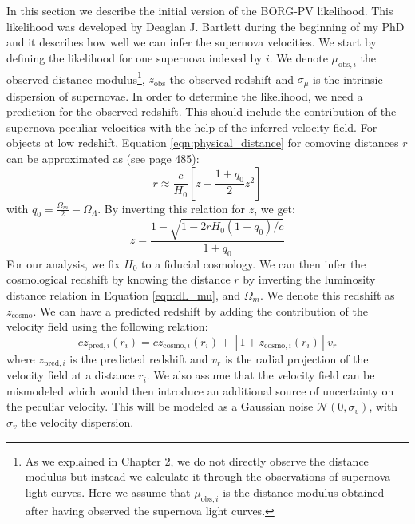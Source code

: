 In this section we describe the initial version of the BORG-PV likelihood. This likelihood was developed by Deaglan J. Bartlett during the beginning of my PhD
and it describes how well we can infer the supernova velocities. We start by defining the likelihood for one supernova indexed by $i$. 
We denote $\mu_{\text{obs},i}$ the observed distance modulus\footnote{As we explained in Chapter 2, we do not directly observe the distance modulus but instead we calculate it through
the observations of supernova light curves. Here we assume that $\mu_{\text{obs},i}$ is the distance modulus obtained after having observed the supernova light curves.}, 
$z_{\text{obs}}$ the observed redshift and $\sigma_{\mu}$ is the intrinsic dispersion of supernovae. 
In order to determine the likelihood, we need a prediction 
for the observed redshift. This should include the contribution of the supernova peculiar velocities with the help of the inferred velocity field. For objects at low redshift, 
Equation \ref{eqn:physical_distance} for comoving distances $r$ can be approximated as (see \cite{Weinberg_1972} page 485):
\begin{equation}
    r \approx \frac{c}{H_0} \left[ z - \frac{1+q_0}{2} z^2 \right]
\end{equation}
with $q_0 = \frac{\Omega_m}{2} - \Omega_{\Lambda} $. By inverting this relation for $z$, we get:
\begin{equation}
    z = \frac{1 - \sqrt{1 - 2rH_0(1+q_0)/c}}{1+q_0}
    \label{eqn:zcosmo}
\end{equation} 
For our analysis, we fix $H_0$ to a fiducial cosmology. We can then infer the cosmological redshift by knowing the distance $r$ 
by inverting the luminosity distance relation in Equation \ref{eqn:dL_mu}, and $\Omega_m$. We 
denote this redshift as $z_{\text{cosmo}}$. We can have a predicted redshift by adding the contribution of the velocity field using the following relation:
\begin{equation}
    cz_{\text{pred},i}(r_i) = cz_{\text{cosmo},i}(r_i) + [1+z_{\text{cosmo},i}(r_i)]v_r
\end{equation}
where $z_{\text{pred}, i}$ is the predicted redshift and $v_r$ is the radial projection of the velocity field at a distance $r_i$. 
We also assume that the 
velocity field can be mismodeled which would then introduce an additional source of uncertainty on the peculiar velocity. 
This will be modeled as a Gaussian noise $\mathcal{N}(0, \sigma_v)$, with $\sigma_v$ the velocity dispersion.\\ 

